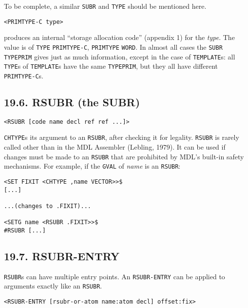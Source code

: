 \documentclass[a4paper,]{article}
\begin{document}
To be complete, a similar \texttt{SUBR} and \texttt{TYPE} should be mentioned here.

\begin{verbatim}
<PRIMTYPE-C type>
\end{verbatim}

 produces an internal ``storage allocation code'' (appendix 1) for the \emph{type}. The
value is of \texttt{TYPE} \texttt{PRIMTYPE-C}, \texttt{PRIMTYPE} \texttt{WORD}. In almost all cases the \texttt{SUBR}
\texttt{TYPEPRIM} gives just as much information, except in the case of \texttt{TEMPLATE}s: all \texttt{TYPE}s of
\texttt{TEMPLATE}s have the same \texttt{TYPEPRIM}, but they all have different \texttt{PRIMTYPE-C}s.

\subsection{19.6. RSUBR (the SUBR)}\label{rsubr-the-subr}

\begin{verbatim}
<RSUBR [code name decl ref ref ...]>
\end{verbatim}

 \texttt{CHTYPE}s its argument to an \texttt{RSUBR}, after checking it for legality.
\texttt{RSUBR} is rarely called other than in the MDL Assembler (Lebling, 1979). It can be used if changes must be made to
an \texttt{RSUBR} that are prohibited by MDL's built-in safety mechanisms. For example, if the \texttt{GVAL} of \emph{name}
is an \texttt{RSUBR}:

\begin{verbatim}
<SET FIXIT <CHTYPE ,name VECTOR>>$
[...]

...(changes to .FIXIT)...

<SETG name <RSUBR .FIXIT>>$
#RSUBR [...]
\end{verbatim}

\subsection{19.7. RSUBR-ENTRY}\label{rsubr-entry}

\texttt{RSUBR}s can have multiple entry points. An \texttt{RSUBR-ENTRY} can be applied to arguments exactly like an
\texttt{RSUBR}.

\begin{verbatim}
<RSUBR-ENTRY [rsubr-or-atom name:atom decl] offset:fix>
\end{verbatim}
\end{document}
